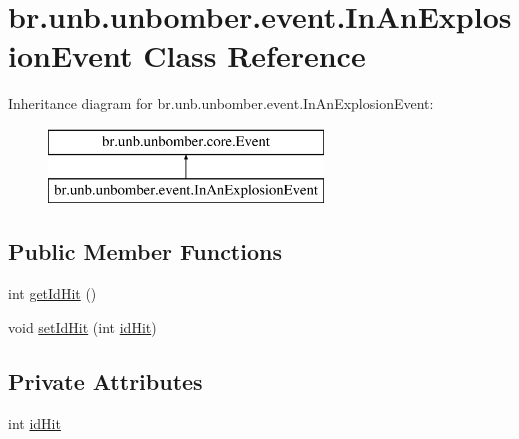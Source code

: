 \hypertarget{classbr_1_1unb_1_1unbomber_1_1event_1_1_in_an_explosion_event}{\section{br.\+unb.\+unbomber.\+event.\+In\+An\+Explosion\+Event Class Reference}
\label{classbr_1_1unb_1_1unbomber_1_1event_1_1_in_an_explosion_event}
}
Inheritance diagram for br.\+unb.\+unbomber.\+event.\+In\+An\+Explosion\+Event\+:\begin{figure}[H]
\begin{center}
\leavevmode
\includegraphics[height=2.000000cm]{classbr_1_1unb_1_1unbomber_1_1event_1_1_in_an_explosion_event}
\end{center}
\end{figure}
\subsection*{Public Member Functions}
\begin{DoxyCompactItemize}
\item 
int \hyperlink{classbr_1_1unb_1_1unbomber_1_1event_1_1_in_an_explosion_event_ac4c363534c3d6092ba67f84e16630ea4}{get\+Id\+Hit} ()
\item 
void \hyperlink{classbr_1_1unb_1_1unbomber_1_1event_1_1_in_an_explosion_event_aff4f837832137e91961fd45907f83923}{set\+Id\+Hit} (int \hyperlink{classbr_1_1unb_1_1unbomber_1_1event_1_1_in_an_explosion_event_aefe91e4cc4d78e7cf7ccfce0dd30bf57}{id\+Hit})
\end{DoxyCompactItemize}
\subsection*{Private Attributes}
\begin{DoxyCompactItemize}
\item 
int \hyperlink{classbr_1_1unb_1_1unbomber_1_1event_1_1_in_an_explosion_event_aefe91e4cc4d78e7cf7ccfce0dd30bf57}{id\+Hit}
\end{DoxyCompactItemize}


